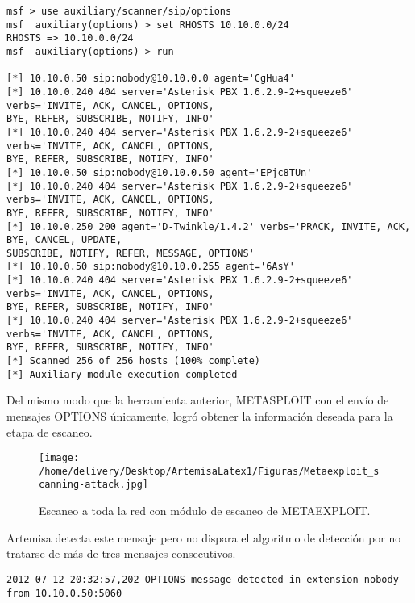 \documentclass[a4paper,12pt]{report}
\newenvironment{myscriptlisting}
{\begin{list}{}{\setlength{\leftmargin}{1em}}\item\scriptsize\bfseries}
{\end{list}}
\begin{document}
\begin{myscriptlisting}
 \begin{verbatim}
msf > use auxiliary/scanner/sip/options
msf  auxiliary(options) > set RHOSTS 10.10.0.0/24 
RHOSTS => 10.10.0.0/24
msf  auxiliary(options) > run

[*] 10.10.0.50 sip:nobody@10.10.0.0 agent='CgHua4' 
[*] 10.10.0.240 404 server='Asterisk PBX 1.6.2.9-2+squeeze6' verbs='INVITE, ACK, CANCEL, OPTIONS,
BYE, REFER, SUBSCRIBE, NOTIFY, INFO' 
[*] 10.10.0.240 404 server='Asterisk PBX 1.6.2.9-2+squeeze6' verbs='INVITE, ACK, CANCEL, OPTIONS,
BYE, REFER, SUBSCRIBE, NOTIFY, INFO' 
[*] 10.10.0.50 sip:nobody@10.10.0.50 agent='EPjc8TUn' 
[*] 10.10.0.240 404 server='Asterisk PBX 1.6.2.9-2+squeeze6' verbs='INVITE, ACK, CANCEL, OPTIONS,
BYE, REFER, SUBSCRIBE, NOTIFY, INFO' 
[*] 10.10.0.250 200 agent='D-Twinkle/1.4.2' verbs='PRACK, INVITE, ACK, BYE, CANCEL, UPDATE,
SUBSCRIBE, NOTIFY, REFER, MESSAGE, OPTIONS' 
[*] 10.10.0.50 sip:nobody@10.10.0.255 agent='6AsY' 
[*] 10.10.0.240 404 server='Asterisk PBX 1.6.2.9-2+squeeze6' verbs='INVITE, ACK, CANCEL, OPTIONS,
BYE, REFER, SUBSCRIBE, NOTIFY, INFO' 
[*] 10.10.0.240 404 server='Asterisk PBX 1.6.2.9-2+squeeze6' verbs='INVITE, ACK, CANCEL, OPTIONS,
BYE, REFER, SUBSCRIBE, NOTIFY, INFO' 
[*] Scanned 256 of 256 hosts (100% complete)
[*] Auxiliary module execution completed

 \end{verbatim}
\end{myscriptlisting}

Del mismo modo que la herramienta anterior, METASPLOIT con el envío de mensajes
OPTIONS únicamente, logró obtener la información deseada para la etapa de
escaneo. 

\begin{figure}[h!] 
\centering
\texttt{[image: /home/delivery/Desktop/ArtemisaLatex1/Figuras/Metaexploit\_scanning-attack.jpg]}
\caption{Escaneo a toda la red con módulo de escaneo de METAEXPLOIT.}
\label{escaneo_metaexploit}
\end{figure}

Artemisa detecta este mensaje pero no dispara el algoritmo de detección por no 
tratarse de más de tres mensajes consecutivos.

\begin{myscriptlisting}
 \begin{verbatim}
2012-07-12 20:32:57,202 OPTIONS message detected in extension nobody from 10.10.0.50:5060
 \end{verbatim}
\end{myscriptlisting}
\end{document}

